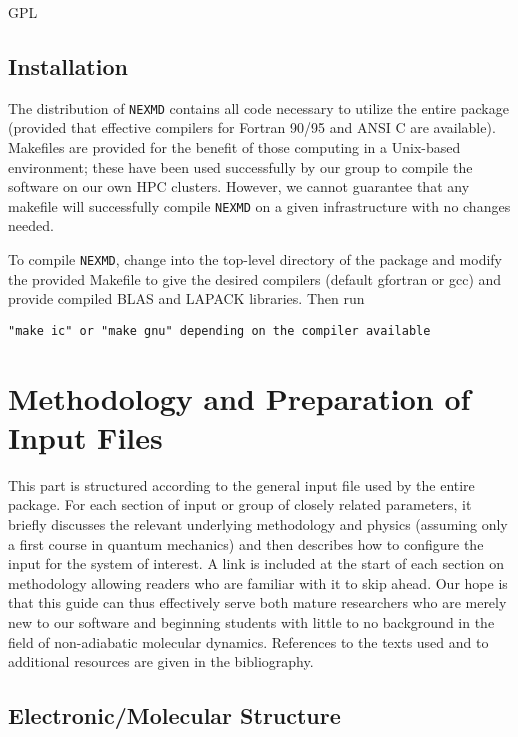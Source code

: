 \documentclass[12pt,letter,footinclude=true,headinclude=true,hyphens,oneside]{book} %
\begin{document}
    GPL
    
    \chapter{Installation}
    
    The distribution of \texttt{NEXMD} contains all code necessary to utilize the entire package (provided that effective compilers for Fortran 90/95 and ANSI C are available). Makefiles are provided for the benefit of those computing in a Unix-based environment; these have been used successfully by our group to compile the software on our own HPC clusters. However, we cannot guarantee that any makefile will successfully compile  \texttt{NEXMD} on a given infrastructure with no changes needed.
    
    To compile \texttt{NEXMD}, change into the top-level directory of the package and modify the provided Makefile to give the desired compilers (default gfortran or gcc) and provide compiled BLAS and LAPACK libraries. Then run
    
    \texttt{"make ic" or "make gnu" depending on the compiler available}    
    
    \part{Methodology and Preparation of Input Files}
    
    This part is structured according to the general input file used by the entire package. For each section of input or group of closely related parameters, it briefly discusses the relevant underlying methodology and physics (assuming only a first course in quantum mechanics) and then describes how to configure the input for the system of interest. A link is included at the start of each section on methodology allowing readers who are familiar with it to skip ahead. Our hope is that this guide can thus effectively serve both mature researchers who are merely new to our software and beginning students with little to no background in the field of non-adiabatic molecular dynamics. References to the texts used and to additional resources are given in the bibliography.
    
    \chapter{Electronic/Molecular Structure}
    
    \label{electronic-structure-intro}
    
\end{document}
